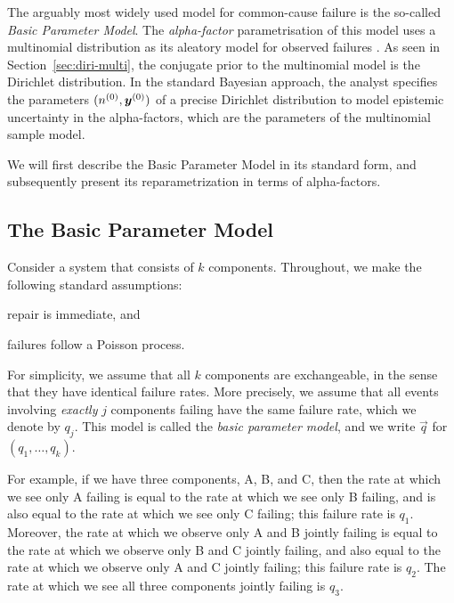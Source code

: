 The arguably most widely used model for common-cause failure is the so-called \emph{Basic Parameter Model}.
The \emph{alpha-factor} parametrisation of this model uses a multinomial distribution
as its aleatory model for observed failures \parencite{1988:mosleh::common:cause}. 
As seen in Section~\ref{sec:diri-multi}, the conjugate prior to the multinomial model is the Dirichlet distribution.
In the standard Bayesian approach, the analyst specifies the parameters $(n^{(0)}, {\bm y}^{(0)})$ of a precise Dirichlet distribution
to model epistemic uncertainty in the alpha-factors, which are the parameters of the multinomial sample model.

We will first describe the Basic Parameter Model in its standard form,
and subsequently present its reparametrization in terms of alpha-factors.


\subsection{The Basic Parameter Model}
\label{sec:basic-param-model}

Consider a system that consists of $k$ components.
Throughout, we make the following standard assumptions:
\begin{inparaenum}[(i)]
\item repair is immediate, and
\item failures follow a Poisson process.
\end{inparaenum}

For simplicity, we assume that all $k$ components are exchangeable,
in the sense that they have identical failure rates.
More precisely,
we assume that all events involving \emph{exactly} $j$ components failing
have the same failure rate, which we denote by $q_j$.
This model is called the \emph{basic parameter model},
and we write $\vec{q}$ for $(q_1,\dots,q_k)$.

For example, if we have three components, A, B, and C,
then the rate at which we see only A failing
is equal to the rate at which we see only B failing,
and is also equal to the rate at which we see only C failing;
this failure rate is $q_1$.
Moreover, the rate at which we observe only A and B jointly failing
is equal to the rate at which we observe only B and C jointly failing,
and also equal to the rate at which we observe only A and C jointly failing;
this failure rate is $q_2$.
The rate at which we see all three components jointly failing is $q_3$.

